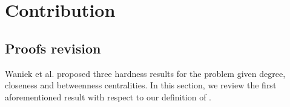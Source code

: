 \chapter{Contribution}



\section{Proofs revision}\label{sec:proofRevs}

Waniek et al. \cite{Waniek2017} proposed three hardness results for the \HL problem given degree, closeness and betweenness
centralities. In this section, we review the first aforementioned result with respect to our definition of \HLshort.

